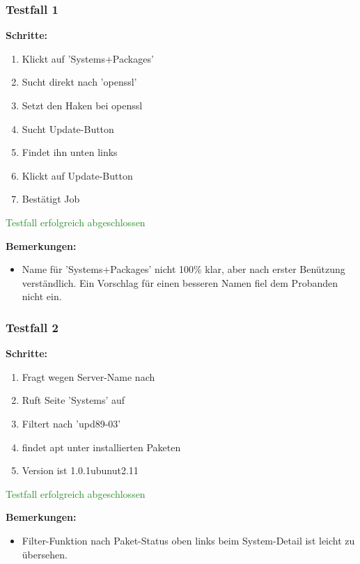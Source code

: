 \subsubsection*{Testfall 1}

\textbf{Schritte:}

\begin{enumerate}
    \item Klickt auf 'Systems+Packages'
    \item Sucht direkt nach 'openssl'
    \item Setzt den Haken bei openssl
    \item Sucht Update-Button
    \item Findet ihn unten links
    \item Klickt auf Update-Button
    \item Bestätigt Job
\end{enumerate}

\textcolor{ForestGreen}{Testfall erfolgreich abgeschlossen}

\bigskip
\textbf{Bemerkungen:}

\begin{itemize}[noitemsep,nolistsep]
    \item Name für 'Systems+Packages' nicht 100\% klar, aber nach erster Benützung verständlich. Ein Vorschlag für einen besseren Namen fiel dem Probanden nicht ein.
\end{itemize}


\subsubsection*{Testfall 2}

\textbf{Schritte:}

\begin{enumerate}
    \item Fragt wegen Server-Name nach
    \item Ruft Seite 'Systems' auf
    \item Filtert nach 'upd89-03'
    \item findet apt unter installierten Paketen
    \item Version ist 1.0.1ubunut2.11
\end{enumerate}

\textcolor{ForestGreen}{Testfall erfolgreich abgeschlossen}

\bigskip
\textbf{Bemerkungen:}

\begin{itemize}[noitemsep,nolistsep]
    \item Filter-Funktion nach Paket-Status oben links beim System-Detail ist leicht zu übersehen.
\end{itemize}


